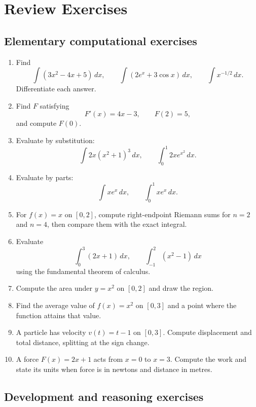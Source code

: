 \section{Review Exercises}

\subsection{Elementary computational exercises}

\begin{enumerate}
\item Find
\[
\int(3x^2-4x+5)\,dx,
\qquad
\int(2e^x+3\cos x)\,dx,
\qquad
\int x^{-1/2}\,dx.
\]
Differentiate each answer.

\item Find $F$ satisfying
\[
F'(x)=4x-3,
\qquad F(2)=5,
\]
and compute $F(0)$.

\item Evaluate by substitution:
\[
\int 2x(x^2+1)^3\,dx,
\qquad
\int_0^1 2xe^{x^2}\,dx.
\]

\item Evaluate by parts:
\[
\int xe^x\,dx,
\qquad
\int_0^1 xe^x\,dx.
\]

\item For $f(x)=x$ on $[0,2]$, compute right-endpoint Riemann sums for $n=2$ and $n=4$, then compare them with the exact integral.

\item Evaluate
\[
\int_0^3(2x+1)\,dx,
\qquad
\int_{-1}^{2}(x^2-1)\,dx
\]
using the fundamental theorem of calculus.

\item Compute the area under $y=x^2$ on $[0,2]$ and draw the region.

\item Find the average value of $f(x)=x^2$ on $[0,3]$ and a point where the function attains that value.

\item A particle has velocity $v(t)=t-1$ on $[0,3]$. Compute displacement and total distance, splitting at the sign change.

\item A force $F(x)=2x+1$ acts from $x=0$ to $x=3$. Compute the work and state its units when force is in newtons and distance in metres.
\end{enumerate}

\subsection{Development and reasoning exercises}

